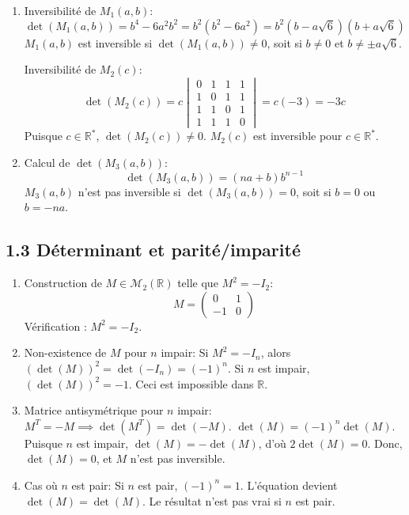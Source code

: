 \documentclass[french]{yLectureNote}
\begin{document}
\begin{enumerate}
    \item[(a)] Inversibilité de $M_{1}(a,b)$:
    $$\det(M_{1}(a,b)) = b^4 - 6a^2b^2 = b^2(b^2 - 6a^2) = b^2(b - a\sqrt{6})(b + a\sqrt{6})$$
    $M_{1}(a,b)$ est inversible si $\det(M_{1}(a,b)) \neq 0$, soit si $b \neq 0$ et $b \neq \pm a\sqrt{6}$.

    Inversibilité de $M_{2}(c)$:
    $$\det(M_{2}(c)) = c \begin{vmatrix}0&1&1&1\\ 1&0&1&1\\ 1&1&0&1\\ 1&1&1&0\end{vmatrix} = c(-3) = -3c$$
    Puisque $c \in \mathbb{R}^{*}$, $\det(M_{2}(c)) \neq 0$. $M_{2}(c)$ est inversible pour $c \in \mathbb{R}^{*}$.

    \item[(b)] Calcul de $\det(M_{3}(a,b))$:
    $$\det(M_{3}(a,b)) = (na+b) b^{n-1}$$
    $M_{3}(a,b)$ n'est pas inversible si $\det(M_{3}(a,b)) = 0$, soit si $b=0$ ou $b=-na$.
\end{enumerate}

\subsection{1.3 Déterminant et parité/imparité}

\begin{enumerate}
    \item[(a)] Construction de $M \in \mathcal{M}_{2}(\mathbb{R})$ telle que $M^{2}=-I_{2}$:
    $$M = \begin{pmatrix} 0 & 1 \\ -1 & 0 \end{pmatrix}$$
    Vérification : $M^2 = -I_{2}$.

    \item[(b)] Non-existence de $M$ pour $n$ impair:
    Si $M^2 = -I_n$, alors $(\det(M))^2 = \det(-I_n) = (-1)^n$.
    Si $n$ est impair, $(\det(M))^2 = -1$. Ceci est impossible dans $\mathbb{R}$.

    \item[(c)] Matrice antisymétrique pour $n$ impair:
    $M^T = -M \implies \det(M^T) = \det(-M)$.
    $\det(M) = (-1)^n \det(M)$.
    Puisque $n$ est impair, $\det(M) = - \det(M)$, d'où $2 \det(M) = 0$.
    Donc, $\det(M) = 0$, et $M$ n'est pas inversible.

    \item[(d)] Cas où $n$ est pair:
    Si $n$ est pair, $(-1)^n = 1$. L'équation devient $\det(M) = \det(M)$. Le résultat n'est pas vrai si $n$ est pair.
\end{enumerate}
\end{document}
